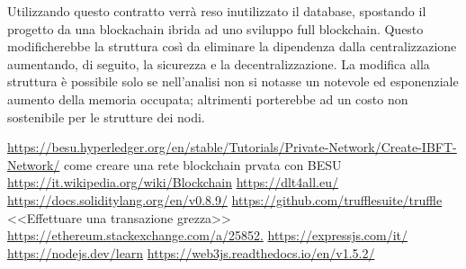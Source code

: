 \documentclass[11pt,a4paper,titlepage, twoside, openright]{report}
\begin{document}
Utilizzando questo contratto verrà reso inutilizzato il database, spostando il progetto da una blockachain ibrida ad uno sviluppo full blockchain. Questo modificherebbe la struttura così da eliminare la dipendenza dalla centralizzazione aumentando, di seguito, la sicurezza e la decentralizzazione. La modifica alla struttura è possibile solo se nell'analisi non si notasse un notevole ed esponenziale aumento della memoria occupata; altrimenti porterebbe ad un costo non sostenibile per le strutture dei nodi.

\begin{thebibliography}{1}
\bibitem{} \url{https://besu.hyperledger.org/en/stable/Tutorials/Private-Network/Create-IBFT-Network/} come creare una rete blockchain prvata con BESU
\bibitem{} \url{https://it.wikipedia.org/wiki/Blockchain}
\bibitem{} \url{https://dlt4all.eu/}
\bibitem{} \url{https://docs.soliditylang.org/en/v0.8.9/}
\bibitem{} \url{https://github.com/trufflesuite/truffle}
\bibitem{}<<Effettuare una transazione grezza>> \url{https://ethereum.stackexchange.com/a/25852.}
\bibitem{} \url{https://expressjs.com/it/}
\bibitem{} \url{https://nodejs.dev/learn}
\bibitem{} \url{https://web3js.readthedocs.io/en/v1.5.2/}
\end{thebibliography}

\listoffigures
\end{document}
